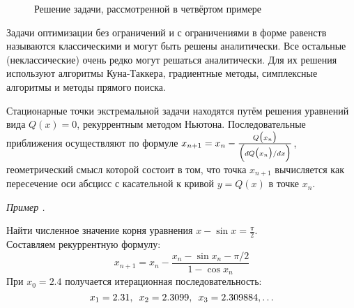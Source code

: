 \documentclass[preprint,russian,a5paper,10pt,twoside,mediummath]{ncc}
\newcommand{\ExampleMy}{\vspace{\baselineskip}\textbf{\underline{Пример:}}\nopagebreak\par}
\newcounter{problem}[section]				%
\renewcommand{\theproblem}{\thesection.\arabic{problem}}		%
\newenvironment{problem}%
	{\par \vspace{\baselineskip} \refstepcounter{problem} \begin{flushright} \textit{Пример \theproblem} \end{flushright} \vspace{-\baselineskip} \begin{oframed}}%
	{\par \end{oframed}}%
\begin{document}


\begin{figure}[ht] \centering
{}
\footnotesize \caption{Решение задачи, рассмотренной в четвёртом примере\label{fig:extremum:fourth_example}}
\end{figure}

Задачи оптимизации без ограничений и с ограничениями в форме равенств называются классическими и могут быть решены аналитически. Все остальные (неклассические) очень редко могут решаться аналитически. Для их решения используют алгоритмы Куна-Таккера, градиентные методы, симплексные алгоритмы и методы прямого поиска.

Стационарные точки экстремальной задачи находятся путём решения уравнений вида $ Q(x) = 0 $, рекуррентным методом Ньютона. Последовательные приближения осуществляют по формуле $ x_{n+1} = x_n - \frac{ Q \bigl( x_n \bigr) }{ \Bigl(  dQ \bigl( x_n \bigr) / dx \Bigr) } $, геометрический смысл которой состоит в том, что точка $ x_{n+1} $ вычисляется как пересечение оси абсцисс с касательной к кривой $ y = Q(x) $ в точке $ x_n $.


\begin{problem}
Найти численное значение корня уравнения $ x - \sin x = \frac{ \pi }{2} $.\\
Составляем рекуррентную формулу:
\[ x_{n+1} = x_n - \frac{ x_n - \sin x_n - \pi/2}{ 1 - \cos x_n } \]
При ${{x}_{0}}=2.4$ получается итерационная последовательность:
\[ x_1 = 2.31, \enskip x_2 = 2.3099, \enskip x_3 = 2.309884, \ldots \]
\end{problem}
\end{document}
